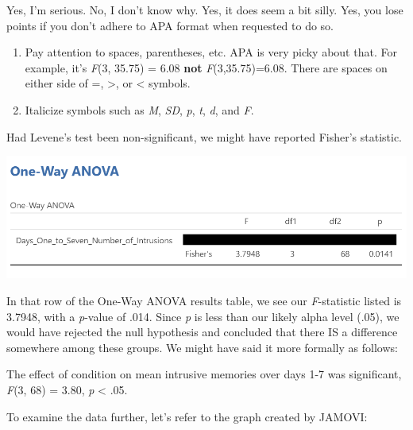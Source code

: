 \documentclass[
]{book}
\begin{document}
Yes, I'm serious. No, I don't know why. Yes, it does seem a bit silly. Yes, you lose points if you don't adhere to APA format when requested to do so.

\begin{enumerate}
\def\labelenumi{\arabic{enumi}.}
\setcounter{enumi}{3}
\item
  Pay attention to spaces, parentheses, etc. APA is very picky about that. For example, it's \emph{F}(3, 35.75) = 6.08 \textbf{not} \emph{F}(3,35.75)=6.08. There are spaces on either side of =, \textgreater, or \textless{} symbols.
\item
  Italicize symbols such as \emph{M}, \emph{SD}, \emph{p}, \emph{t}, \emph{d}, and \emph{F}.
\end{enumerate}

Had Levene's test been non-significant, we might have reported Fisher's statistic.

\includegraphics{img/OneWayANOVAResultsANOVATableReadingFishers.png}

In that row of the One-Way ANOVA results table, we see our \emph{F}-statistic listed is 3.7948, with a \emph{p}-value of .014. Since \emph{p} is less than our likely alpha level (.05), we would have rejected the null hypothesis and concluded that there IS a difference somewhere among these groups. We might have said it more formally as follows:

The effect of condition on mean intrusive memories over days 1-7 was significant, \emph{F}(3, 68) = 3.80, \emph{p} \textless{} .05.

To examine the data further, let's refer to the graph created by JAMOVI:
\end{document}
